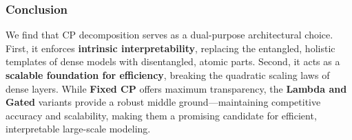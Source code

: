 \subsubsection{Conclusion}

We find that CP decomposition serves as a dual-purpose architectural choice. First, it enforces \textbf{intrinsic interpretability}, replacing the entangled, holistic templates of dense models with disentangled, atomic parts. Second, it acts as a \textbf{scalable foundation for efficiency}, breaking the quadratic scaling laws of dense layers. While \textbf{Fixed CP} offers maximum transparency, the \textbf{Lambda and Gated} variants provide a robust middle ground—maintaining competitive accuracy and scalability, making them a promising candidate for efficient, interpretable large-scale modeling.